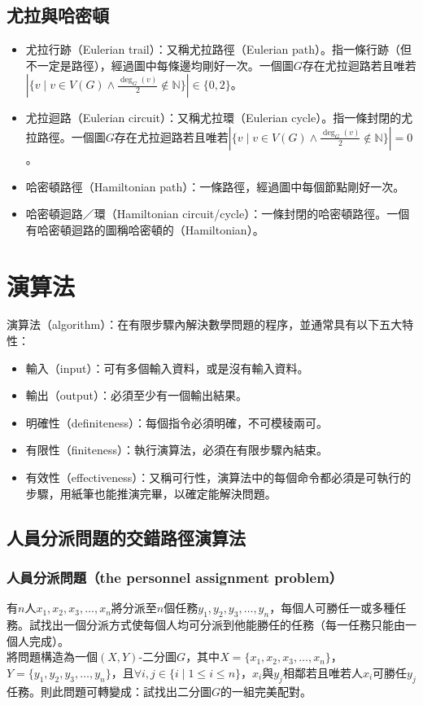 \documentclass[a4paper,12pt]{report}
\begin{document}
\subsection{尤拉與哈密頓}
\begin{itemize}
\item 尤拉行跡（Eulerian trail）：又稱尤拉路徑（Eulerian path）。指一條行跡（但不一定是路徑），經過圖中每條邊均剛好一次。一個圖$G$存在尤拉迴路若且唯若$\left|\{v\mid v\in V(G)\wedge \frac{\deg_G(v)}{2}\notin \mathbb{N}\}\right|\in \{0, 2\}$。
\item 尤拉迴路（Eulerian circuit）：又稱尤拉環（Eulerian cycle）。指一條封閉的尤拉路徑。一個圖$G$存在尤拉迴路若且唯若$\left|\{v\mid v\in V(G)\wedge \frac{\deg_G(v)}{2}\notin \mathbb{N}\}\right|=0$。
\item 哈密頓路徑（Hamiltonian path）：一條路徑，經過圖中每個節點剛好一次。
\item 哈密頓迴路／環（Hamiltonian circuit/cycle）：一條封閉的哈密頓路徑。一個有哈密頓迴路的圖稱哈密頓的（Hamiltonian）。
\end{itemize}
\section{演算法}
演算法（algorithm）：在有限步驟內解決數學問題的程序，並通常具有以下五大特性：
\begin{itemize}
\item 輸入（input）：可有多個輸入資料，或是沒有輸入資料。
\item 輸出（output）：必須至少有一個輸出結果。
\item 明確性（definiteness）：每個指令必須明確，不可模稜兩可。
\item 有限性（finiteness）：執行演算法，必須在有限步驟內結束。
\item 有效性（effectiveness）：又稱可行性，演算法中的每個命令都必須是可執行的步驟，用紙筆也能推演完畢，以確定能解決問題。
\end{itemize}
\subsection{人員分派問題的交錯路徑演算法}
\subsubsection{人員分派問題（the personnel assignment problem）}
有$n$人$x_1, x_2, x_3, \ldots, x_n$將分派至$n$個任務$y_1, y_2, y_3, \ldots, y_n$，每個人可勝任一或多種任務。試找出一個分派方式使每個人均可分派到他能勝任的任務（每一任務只能由一個人完成）。 \\
將問題構造為一個$(X, Y)$-二分圖$G$，其中$X=\{x_1, x_2, x_3, \ldots, x_n\}$，$Y=\{y_1, y_2, y_3, \ldots, y_n\}$，且$\forall i, j \in \{i\mid 1\leq i\leq n\}$，$x_i$與$y_j$相鄰若且唯若人$x_i$可勝任$y_j$任務。則此問題可轉變成：試找出二分圖$G$的一組完美配對。
\end{document}
